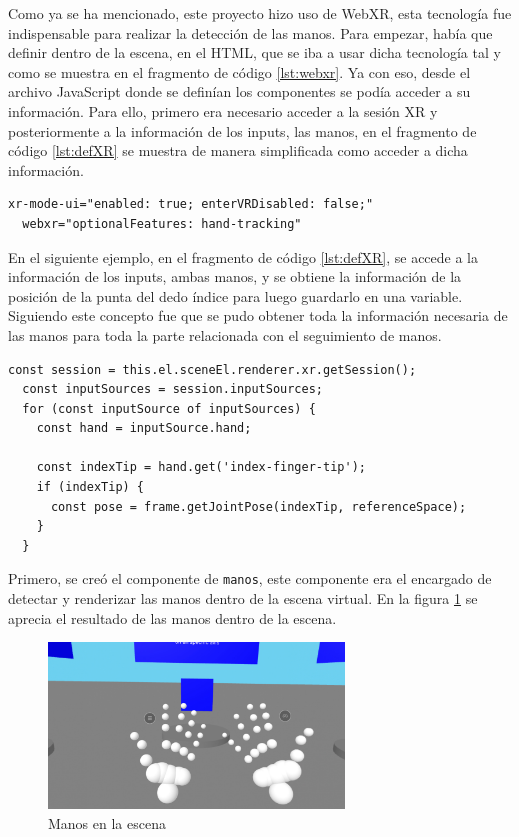 \documentclass[a4paper, 12pt]{book}
\begin{document}
Como ya se ha mencionado, este proyecto hizo uso de WebXR, esta tecnología fue indispensable para realizar la detección de las manos. Para empezar, había que definir dentro de la escena, en el HTML, que se iba a usar dicha tecnología tal y como se muestra en el fragmento de código \ref{lst:webxr}. Ya con eso, desde el archivo JavaScript donde se definían los componentes se podía acceder a su información. Para ello, primero era necesario acceder a la sesión XR y posteriormente a la información de los inputs, las manos, en el fragmento de código \ref{lst:defXR} se muestra de manera simplificada como acceder a dicha información.

\begin{lstlisting}[caption=Definición de WebXR en la escena, captionpos=b, label=lst:webxr]
  xr-mode-ui="enabled: true; enterVRDisabled: false;" 
  webxr="optionalFeatures: hand-tracking"
\end{lstlisting}

En el siguiente ejemplo, en el fragmento de código \ref{lst:defXR}, se accede a la información de los inputs, ambas manos, y se obtiene la información de la posición de la punta del dedo índice para luego guardarlo en una variable. Siguiendo este concepto fue que se pudo obtener toda la información necesaria de las manos para toda la parte relacionada con el seguimiento de manos.

\begin{lstlisting}[caption=Ejemplo simplificado de acceder a la información XR, captionpos=b, label=lst:defXR]
  const session = this.el.sceneEl.renderer.xr.getSession();
  const inputSources = session.inputSources;
  for (const inputSource of inputSources) {
    const hand = inputSource.hand;
    
    const indexTip = hand.get('index-finger-tip');
    if (indexTip) {
      const pose = frame.getJointPose(indexTip, referenceSpace);
    }
  }
\end{lstlisting}


Primero, se creó el componente de \texttt{manos}, este componente era el encargado de detectar y renderizar las manos dentro de la escena virtual. En la figura \ref{fig:manos} se aprecia el resultado de las manos dentro de la escena.

\begin{figure}[H] 
  \centering
  \includegraphics[width=0.7\textwidth]{img/manos.jpg} 
  \caption{Manos en la escena}
  \label{fig:manos}
\end{figure}
\end{document}
